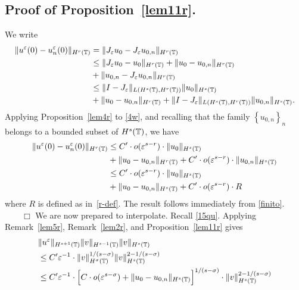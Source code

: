 \subsection{Proof of Proposition~\ref{lem11r}.} We write
\medskip
\begin{equation}
\begin{split}
\|u^\varepsilon(0) - u_n^\varepsilon (0) \|_{H^r(\mathbb{T})} 
& = \|J_\varepsilon u_0 - J_\varepsilon u_{0,n} \|_{H^r(\mathbb{T})}
\\
& \le \|J_\varepsilon u_0 - u_0 \|_{H^r(\mathbb{T})} + \| u_0 - u_{0,n}
\|_{H^r(\mathbb{T})}
\\
& + \|u_{0,n} - J_\varepsilon u_{0,n} \|_{H^r(\mathbb{T})}
\\
& \le \|I - J_\varepsilon\|_{L(H^s(\mathbb{T}), H^r(\mathbb{T}))} \|u_0\|_{H^s(\mathbb{T})}
\\
& +
\|u_0 - u_{0,n} \|_{H^r(\mathbb{T})} + 
\|I - J_\varepsilon\|_{L(H^s(\mathbb{T}), H^r(\mathbb{T}))} \|u_{0,n}\|_{H^s(\mathbb{T})}.
\label{4w}
\end{split}
\end{equation}
Applying Proposition~\ref{lem4r} to \eqref{4w}, and recalling that the family
$\left\{ u_{0,n} \right\}_n$ belongs to a bounded subset of
$H^s(\mathbb{T})$, we have
\medskip
\begin{equation}
\label{finito}
\begin{split}
\|u^\varepsilon(0) - u_n^\varepsilon (0) \|_{H^r(\mathbb{T})} 
& \le
C' \cdot o(\varepsilon^{s-r}) \cdot \|u_0\|_{H^s(\mathbb{T})}
\\
& + \|u_0 - u_{0,n} \|_{H^r(\mathbb{T})} + C' \cdot o (\varepsilon^{s-r}) \cdot
\|u_{0,n}\|_{H^s(\mathbb{T})}
\\
& \le
C' \cdot o(\varepsilon^{s-r}) \cdot \|u_0\|_{H^s(\mathbb{T})}
\\
& + \|u_0 - u_{0,n} \|_{H^s(\mathbb{T})} + C' \cdot o (\varepsilon^{s-r}) \cdot
R
\end{split}
\end{equation}
where $R$ is defined as in~\ref{r-def}. The result follows immediately from
\eqref{finito}. $\qquad \Box$
We are now prepared to interpolate. Recall \eqref{15qu}. Applying Remark~\ref{lem5r}, Remark~\ref{lem2r}, and
Proposition~\ref{lem11r} gives
\begin{equation*}
\begin{split}
& \|u^\varepsilon \|_{H^{s+1}(\mathbb{T})} \|v\|_{H^{s-1}(\mathbb{T})} \|v\|_{H^s
(\mathbb{T})}
\\
&\le C' \varepsilon^{-1} \cdot \|v\|_{H^\sigma(\mathbb{T})}^{1/(s-\sigma)}
\|v\|_{H^s(\mathbb{T})}^{2 - 1/(s- \sigma)}
\\
& \le C' \varepsilon^{-1} \cdot \Big [C \cdot o(\varepsilon^{s- \sigma}) + \|u_0 -
u_{0,n}\|_{H^s(\mathbb{T})} \Big ]^{1/(s-\sigma)}
\cdot \|v\|_{H^s(\mathbb{T})}^{2- 1/(s-\sigma)}
\end{split}
\end{equation*}
